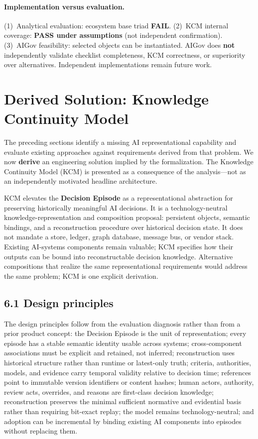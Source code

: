 \documentclass[11pt,a4paper]{article}
\begin{document}
\paragraph{Implementation versus evaluation.}
(1)~Analytical evaluation: ecosystem base triad \textbf{FAIL}. (2)~KCM internal coverage: \textbf{PASS under assumptions} (not independent confirmation). (3)~AIGov feasibility: selected objects can be instantiated. AIGov does \textbf{not} independently validate checklist completeness, KCM correctness, or superiority over alternatives. Independent implementations remain future work.


\section{Derived Solution: Knowledge Continuity Model}

The preceding sections identify a missing AI representational capability and evaluate existing approaches against requirements derived from that problem. We now \textbf{derive} an engineering solution implied by the formalization. The Knowledge Continuity Model (KCM) is presented as a consequence of the analysis---not as an independently motivated headline architecture.


KCM elevates the \textbf{Decision Episode} as a representational abstraction for preserving historically meaningful AI decisions. It is a technology-neutral knowledge-representation and composition proposal: persistent objects, semantic bindings, and a reconstruction procedure over historical decision state. It does not mandate a store, ledger, graph database, message bus, or vendor stack. Existing AI-systems components remain valuable; KCM specifies how their outputs can be bound into reconstructable decision knowledge. Alternative compositions that realize the same representational requirements would address the same problem; KCM is one explicit derivation.


\subsection{6.1 Design principles}

The design principles follow from the evaluation diagnosis rather than from a prior product concept: the Decision Episode is the unit of representation; every episode has a stable semantic identity usable across systems; cross-component associations must be explicit and retained, not inferred; reconstruction uses historical structure rather than runtime or latest-only truth; criteria, authorities, models, and evidence carry temporal validity relative to decision time; references point to immutable version identifiers or content hashes; human actors, authority, review acts, overrides, and reasons are first-class decision knowledge; reconstruction preserves the minimal sufficient normative and evidential basis rather than requiring bit-exact replay; the model remains technology-neutral; and adoption can be incremental by binding existing AI components into episodes without replacing them.
\end{document}
